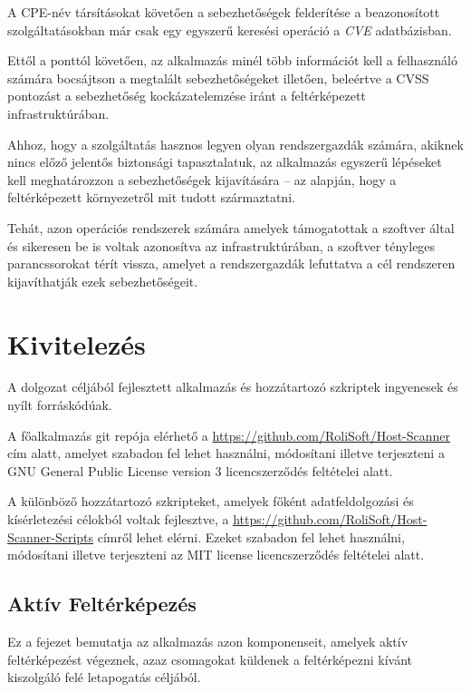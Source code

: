 \documentclass[a4paper,12pt]{article}
\begin{document}
	A CPE-név társításokat követően a sebezhetőségek felderítése a beazonosított szolgáltatásokban már csak egy egyszerű keresési operáció a \textit{CVE} adatbázisban.
	
	Ettől a ponttól követően, az alkalmazás minél több információt kell a felhasználó számára bocsájtson a megtalált sebezhetőségeket illetően, beleértve a CVSS pontozást a sebezhetőség kockázatelemzése iránt a feltérképezett infrastruktúrában.

	Ahhoz, hogy a szolgáltatás hasznos legyen olyan rendszergazdák számára, akiknek nincs előző jelentős biztonsági tapasztalatuk, az alkalmazás egyszerű lépéseket kell meghatározzon a sebezhetőségek kijavítására -- az alapján, hogy a feltérképezett környezetről mit tudott származtatni.

	Tehát, azon operációs rendszerek számára amelyek támogatottak a szoftver által és sikeresen be is voltak azonosítva az infrastruktúrában, a szoftver tényleges parancssorokat térít vissza, amelyet a rendszergazdák lefuttatva a cél rendszeren kijavíthatják ezek sebezhetőségeit.

\section{Kivitelezés}

	A dolgozat céljából fejlesztett alkalmazás és hozzátartozó szkriptek ingyenesek és nyílt forráskódúak.

	A főalkalmazás git repója elérhető a \url{https://github.com/RoliSoft/Host-Scanner} cím alatt, amelyet szabadon fel lehet használni, módosítani illetve terjeszteni a GNU General Public License version 3\cite{gplv3} licencszerződés feltételei alatt.
	
	A különböző hozzátartozó szkripteket, amelyek főként adatfeldolgozási és kísérletezési célokból voltak fejlesztve, a \url{https://github.com/RoliSoft/Host-Scanner-Scripts} címről lehet elérni. Ezeket szabadon fel lehet használni, módosítani illetve terjeszteni az MIT license\cite{mit} licencszerződés feltételei alatt.

\subsection{Aktív Feltérképezés}

	Ez a fejezet bemutatja az alkalmazás azon komponenseit, amelyek aktív feltérképezést végeznek, azaz csomagokat küldenek a feltérképezni kívánt kiszolgáló felé letapogatás céljából.
\end{document}
